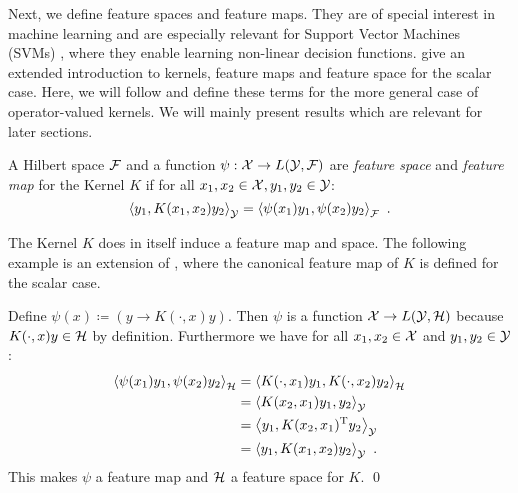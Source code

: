Next, we define feature spaces and feature maps.
They are of special interest in machine learning and are especially relevant for Support Vector Machines (SVMs) \cite{steinwart08}, where they enable learning non-linear decision functions.
\citet{steinwart08} give an extended introduction to kernels, feature maps and feature space for the scalar case.
Here, we will follow \cite{owhadi20} and define these terms for the more general case of operator-valued kernels.
We will mainly present results which are relevant for later sections.

\begin{definition}
	\label{def:feature-map-space}
	A Hilbert space $\mathcal{F}$ and a function $\psi: \mathcal{X} \rightarrow L(\mathcal{Y}, \mathcal{F})$ are \emph{feature space} and \emph{feature map} for the Kernel $K$ if for all $x_1, x_2 \in \mathcal{X}, y_1, y_2 \in \mathcal{Y}$:
	\begin{equation}
		\left< y_1, K(x_1, x_2) y_2\right>_{\mathcal{Y}} = \left< \psi(x_1) y_1, \psi(x_2) y_2\right>_{\mathcal{F}} \ .
	\end{equation}
\end{definition}

The Kernel $K$ does in itself induce a feature map and space.
The following example is an extension of \cite[Lemma~4.19]{steinwart08}, where the canonical feature map of $K$ is defined for the scalar case.
\begin{example}
	Define $\psi(x) \coloneqq \left(y \rightarrow K(\cdot, x)y\right)$.
	Then $\psi$ is a function $\mathcal{X} \rightarrow L(\mathcal{Y},\mathcal{H})$ because $K(\cdot, x) y \in \mathcal{H}$ by definition.
	Furthermore we have for all $x_1, x_2 \in \mathcal{X}$ and $y_1, y_2 \in \mathcal{Y}$:
	\begin{align}
		\left<\psi(x_1) y_1, \psi(x_2)y_2 \right>_{\mathcal{H}} &= 
		\left< K(\cdot, x_1) y_1, K(\cdot, x_2) y_2\right>_{\mathcal{H}}\\
		& = \left< K(x_2, x_1) y_1, y_2 \right>_{\mathcal{Y}} \\
		& = \left< y_1, K(x_2, x_1)^{\mathrm{T}} y_2 \right>_{\mathcal{Y}}\\
		& = \left< y_1, K(x_1, x_2) y_2\right>_{\mathcal{Y}} \ .		
	\end{align}
	This makes $\psi$ a feature map and $\mathcal{H}$ a feature space for $K$. \qed
\end{example}

